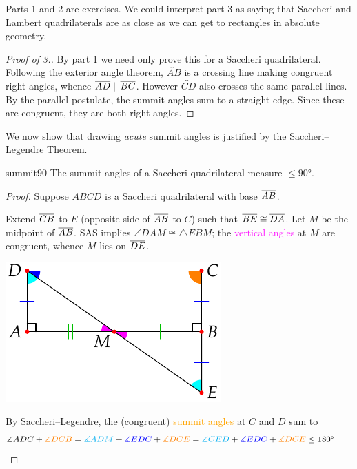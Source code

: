 Parts 1 and 2 are exercises. We could interpret part 3 as saying that Saccheri and Lambert quadrilaterals are as close as we can get to rectangles in absolute geometry.

\begin{proof}[Proof of 3.]
	By part 1 we need only prove this for a Saccheri quadrilateral.
	Following the exterior angle theorem, $\overleftrightarrow{AB}$ is a crossing line making congruent right-angles, whence $\cl{AD}\parallel\cl{BC}$.\smallbreak
	However $\overleftrightarrow{CD}$ also crosses the same parallel lines. By the parallel postulate, the summit angles sum to a straight edge. Since these are congruent, they are both right-angles. 
\end{proof}

We now show that drawing \emph{acute} summit angles is justified by the Saccheri--Legendre Theorem.

\begin{thm}{}{summit90}
	The summit angles of a Saccheri quadrilateral measure $\le \ang{90}$. 
\end{thm}

\begin{proof}
	Suppose $ABCD$ is a Saccheri quadrilateral with base $\cl{AB}$.\par
	\begin{minipage}[t]{0.65\linewidth}\vspace{-4pt}
		Extend $\cl{CB}$ to $E$ (opposite side of $\cl{AB}$ to $C$) such that $\cl{BE}\cong\cl{DA}$. Let $M$ be the midpoint of $\cl{AB}$.\smallbreak
	SAS implies $\angle DAM\cong \triangle EBM$; the \textcolor{Magenta}{vertical angles} at $M$ are congruent, whence $M$ lies on $\cl{DE}$.
	\end{minipage}
	\hfill
	\begin{minipage}[t]{0.34\linewidth}\vspace{-22pt}
		\flushright\includegraphics[scale=0.9]{history-quad2}\vspace{-5pt}
	\end{minipage}\par
	By Saccheri--Legendre, the (congruent) \textcolor{orange}{summit angles} at $C$ and $D$ sum to
	\[
		\measuredangle ADC +\textcolor{orange}{\measuredangle DCB} =\textcolor{cyan}{\measuredangle ADM} +\textcolor{blue}{\measuredangle EDC} +\textcolor{orange}{\measuredangle DCE} =\textcolor{cyan}{\measuredangle CED} +\textcolor{blue}{\measuredangle EDC} +\textcolor{orange}{\measuredangle DCE} \le \ang{180} \tag*{\qedhere}
	\]
\end{proof}



